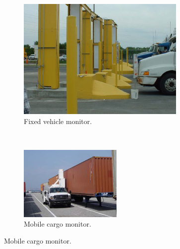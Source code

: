 \documentclass{report}
\begin{document}
\begin{figure}
        \centering
        \begin{subfigure}[b]{0.3\textwidth}
                \includegraphics[width=\textwidth,scale=1]{./figures/fixed_vehicle.png}
                \caption{Fixed  vehicle monitor.}
                \label{fig:fixed_vehicle}
        \end{subfigure}%
        ~ %
        \begin{subfigure}[b]{0.3\textwidth}
                \includegraphics[width=\textwidth,scale=1]{./figures/mobile_cargo.png}
                \caption{Mobile cargo monitor.}
                \label{fig:mobile_cargo}

\end{subfigure}
\end{figure}
\end{document}

